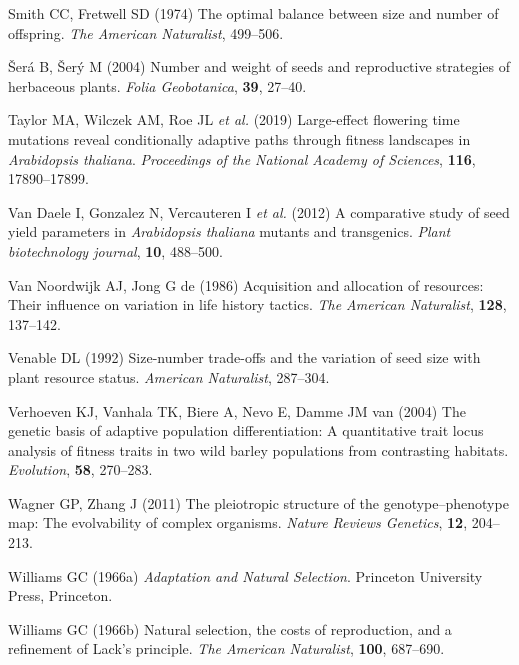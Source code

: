 \documentclass[]{article}
\begin{document}
\leavevmode\hypertarget{ref-Smith1974}{}%
Smith CC, Fretwell SD (1974) The optimal balance between size and number of offspring. \emph{The American Naturalist}, 499--506.

\leavevmode\hypertarget{ref-Sera2004}{}%
Šerá B, Šerý M (2004) Number and weight of seeds and reproductive strategies of herbaceous plants. \emph{Folia Geobotanica}, \textbf{39}, 27--40.

\leavevmode\hypertarget{ref-taylor2019large}{}%
Taylor MA, Wilczek AM, Roe JL \emph{et al.} (2019) Large-effect flowering time mutations reveal conditionally adaptive paths through fitness landscapes in \emph{Arabidopsis thaliana}. \emph{Proceedings of the National Academy of Sciences}, \textbf{116}, 17890--17899.

\leavevmode\hypertarget{ref-van2012comparative}{}%
Van Daele I, Gonzalez N, Vercauteren I \emph{et al.} (2012) A comparative study of seed yield parameters in \emph{Arabidopsis thaliana} mutants and transgenics. \emph{Plant biotechnology journal}, \textbf{10}, 488--500.

\leavevmode\hypertarget{ref-VanNoordwijk1986}{}%
Van Noordwijk AJ, Jong G de (1986) Acquisition and allocation of resources: Their influence on variation in life history tactics. \emph{The American Naturalist}, \textbf{128}, 137--142.

\leavevmode\hypertarget{ref-Venable1992}{}%
Venable DL (1992) Size-number trade-offs and the variation of seed size with plant resource status. \emph{American Naturalist}, 287--304.

\leavevmode\hypertarget{ref-Verhoeven2004}{}%
Verhoeven KJ, Vanhala TK, Biere A, Nevo E, Damme JM van (2004) The genetic basis of adaptive population differentiation: A quantitative trait locus analysis of fitness traits in two wild barley populations from contrasting habitats. \emph{Evolution}, \textbf{58}, 270--283.

\leavevmode\hypertarget{ref-wagner2011pleiotropic}{}%
Wagner GP, Zhang J (2011) The pleiotropic structure of the genotype--phenotype map: The evolvability of complex organisms. \emph{Nature Reviews Genetics}, \textbf{12}, 204--213.

\leavevmode\hypertarget{ref-Williams1966}{}%
Williams GC (1966a) \emph{Adaptation and Natural Selection}. Princeton University Press, Princeton.

\leavevmode\hypertarget{ref-Williams1966a}{}%
Williams GC (1966b) Natural selection, the costs of reproduction, and a refinement of Lack's principle. \emph{The American Naturalist}, \textbf{100}, 687--690.
\end{document}
